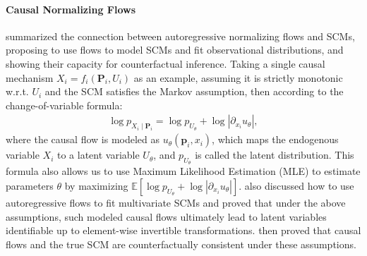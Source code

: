 \documentclass{article}
\theoremstyle{plain}
\theoremstyle{definition}
\theoremstyle{remark}
\begin{document}
\paragraph{Causal Normalizing Flows}
\label{ssec:causal_flow}
\citet{Javaloy2023} summarized the connection between autoregressive normalizing flows and SCMs, proposing to use flows to model SCMs and fit observational distributions, and showing their capacity for counterfactual inference. Taking a single causal mechanism $X_i=f_i(\bm{P}_i,U_i)$ as an example, assuming it is strictly monotonic w.r.t. $U_i$ and the SCM satisfies the Markov assumption, then according to the change-of-variable formula:
\begin{align}
\label{eq:cov_cflow}
\log p_{X_i\mid\bm{P}_i}=\log p_{U_{\theta}}+\log |\partial_{x_i}u_\theta|,
\end{align}
where the causal flow is modeled as $u_\theta(\bm{p}_i,x_i)$, which maps the endogenous variable $X_i$ to a latent variable $U_\theta$, and $p_{U_{\theta}}$ is called the latent distribution. This formula also allows us to use Maximum Likelihood Estimation (MLE) to estimate parameters $\theta$ by maximizing $\mathbb{E}[\log p_{U_{\theta}}+\log|\partial_{x_i}u_\theta|]$. \citet{Javaloy2023} also discussed how to use autoregressive flows to fit multivariate SCMs and proved that under the above assumptions, such modeled causal flows ultimately lead to latent variables identifiable up to element-wise invertible transformations. \citet{Chen2025} then proved that causal flows and the true SCM are counterfactually consistent under these assumptions.%
\end{document}
